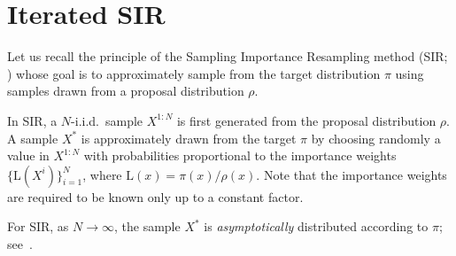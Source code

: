 \documentclass{article}
\def\iid{i.i.d.}
\newcommand{\1}{\mathds{1}}
\def\iid{i.i.d.}
\def\target{\pi}
\def\proposal{\rho}
\newcommand{\chunku}[3]{#1^{#2:#3}}
\def\likelihood{\mathrm{L}}
\begin{document}
\section{Iterated SIR}
\label{app:i-SIR}
Let us recall the principle of the Sampling Importance Resampling method (SIR; \citet{rubin1987comment,smith1992bayesian}) whose goal is to approximately sample from the target distribution $\target$ using samples drawn from a proposal distribution $\proposal$.

In SIR, a $N$-\iid\ sample $\chunku{X}{1}{N}$ is first generated from the proposal distribution $\proposal$. A sample $X^*$ is approximately drawn from the target $\target$ by choosing randomly a value in $\chunku{X}{1}{N}$ with probabilities proportional to the importance weights $\{\likelihood(X^i)\}_{i = 1}^N$, where $\likelihood(x)= \target(x)/\proposal(x)$. Note that the importance weights are required to be known only up to a constant factor.

For SIR, as $N \to \infty$, the sample $X^*$ is \emph{asymptotically} distributed according to $\target$; see~\cite{smith1992bayesian}. 
\end{document}

